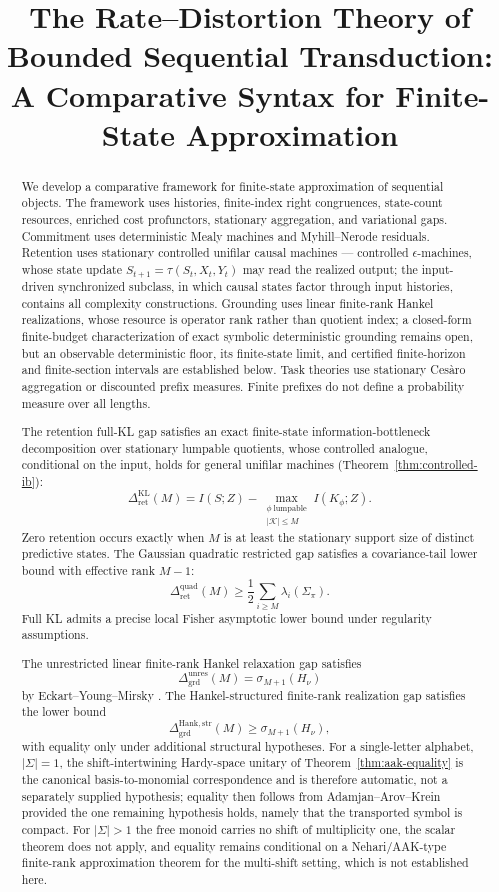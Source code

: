 \documentclass[12pt]{article}
\title{
\bfseries
The Rate--Distortion Theory of Bounded Sequential Transduction:\\
A Comparative Syntax for Finite-State Approximation
}
\author{}
\date{}
\theoremstyle{definition}
\newcommand{\RetKL}{\Delta_{\mathrm{ret}}^{\mathrm{KL}}}
\newcommand{\RetQuad}{\Delta_{\mathrm{ret}}^{\mathrm{quad}}}
\newcommand{\Dunres}{\Delta_{\mathrm{grd}}^{\mathrm{unres}}}
\newcommand{\DHankstr}{\Delta_{\mathrm{grd}}^{\mathrm{Hank,str}}}
\begin{document}
\maketitle

\begin{abstract}
We develop a comparative framework for finite-state approximation of
sequential objects.  The framework uses histories, finite-index right
congruences, state-count resources, enriched cost profunctors, stationary
aggregation, and variational gaps.  Commitment uses deterministic Mealy
machines and Myhill--Nerode residuals.  Retention uses stationary controlled
unifilar causal machines --- controlled $\epsilon$-machines, whose state update
$S_{t+1}=\tau(S_t,X_t,Y_t)$ may read the realized output; the input-driven
synchronized subclass, in which causal states factor through input histories,
contains all complexity constructions.
Grounding uses linear finite-rank Hankel realizations, whose resource is
operator rank rather than quotient index; a closed-form finite-budget
characterization of exact symbolic deterministic grounding remains open, but
an observable deterministic floor, its finite-state limit, and certified
finite-horizon and finite-section intervals are established below.  Task theories use stationary
Ces\`aro aggregation or discounted prefix measures.  Finite prefixes do not
define a probability measure over all lengths.

The retention full-KL gap satisfies an exact finite-state
information-bottleneck decomposition over stationary lumpable quotients, whose
controlled analogue, conditional on the input, holds for general unifilar
machines (Theorem~\ref{thm:controlled-ib}):
\[
\RetKL(M)
=
I(S;Z)
-
\max_{\substack{
\phi\ \text{lumpable}\\
|\mathcal K|\le M
}}
I(K_\phi;Z).
\]
Zero retention occurs exactly when $M$ is at least the stationary support size
of distinct predictive states.  The Gaussian quadratic restricted gap
satisfies a covariance-tail lower bound with effective rank $M-1$:
\[
\RetQuad(M)
\ge
\frac12
\sum_{i\ge M}
\lambda_i(\Sigma_\pi).
\]
Full KL admits a precise local Fisher asymptotic lower bound under regularity
assumptions.

The unrestricted linear finite-rank Hankel relaxation gap satisfies
\[
\Dunres(M)
=
\sigma_{M+1}(H_\nu)
\]
by Eckart--Young--Mirsky \cite{eckart1936,mirsky1960}.  The Hankel-structured finite-rank realization gap
satisfies the lower bound
\[
\DHankstr(M)
\ge
\sigma_{M+1}(H_\nu),
\]
with equality only under additional structural hypotheses.  For a single-letter
alphabet, $|\Sigma|=1$, the shift-intertwining Hardy-space unitary of
Theorem~\ref{thm:aak-equality} is the canonical basis-to-monomial
correspondence and is therefore automatic, not a separately supplied
hypothesis; equality then follows from Adamjan--Arov--Krein provided the one
remaining hypothesis holds, namely that the transported symbol is compact.
For $|\Sigma|>1$ the free monoid carries no shift of multiplicity one, the
scalar theorem does not apply, and equality remains conditional on a
Nehari/AAK-type finite-rank approximation theorem for the multi-shift
setting, which is not established here.


\end{abstract}
\end{document}
